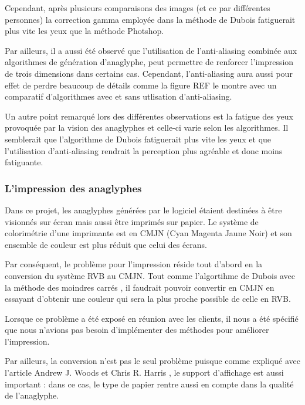 Cependant, après plusieurs comparaisons des images (et ce par différentes personnes) la correction gamma employée dans la méthode de Dubois fatiguerait plus vite les yeux que la méthode Photshop.

Par ailleurs, il a aussi été observé que l'utilisation de l'anti-aliasing combinée aux algorithmes de génération d'anaglyphe, peut permettre de renforcer l'impression de trois dimensions dans certains cas. Cependant, l'anti-aliasing aura aussi pour effet de perdre beaucoup de détails comme la figure REF le montre avec un comparatif d'algorithmes avec et sans utlisation d'anti-aliasing. 

Un autre point remarqué lors des différentes observations est la fatigue des yeux provoquée par la vision des anaglyphes et celle-ci varie selon les algorithmes. Il semblerait que l'algorithme de Dubois fatiguerait plus vite les yeux et que l'utilisation d'anti-aliasing rendrait la perception plus agréable et donc moins fatiguante. 

\subsubsection{L'impression des anaglyphes}
Dans ce projet, les anaglyphes générées par le logiciel étaient destinées à être visionnés sur écran mais aussi être imprimés sur papier. Le système de colorimétrie d'une imprimante est en CMJN (Cyan Magenta Jaune Noir) et son ensemble de couleur est plus réduit que celui des écrans. 


Par conséquent, le problème pour l'impression réside tout d'abord en la conversion du système RVB au CMJN. Tout comme l'algortihme de Dubois avec la méthode des moindres carrés \cite{algoDubois}, il faudrait pouvoir convertir en CMJN en essayant d'obtenir une couleur qui sera la plus proche possible de celle en RVB. 

Lorsque ce problème a été exposé en réunion avec les clients, il nous a été spécifié que nous n'avions pas besoin d'implémenter des méthodes pour améliorer l'impression. 

Par ailleurs, la conversion n'est pas le seul problème puisque comme expliqué avec l'article Andrew J. Woods et Chris R. Harris \cite{anaglypheDefaut}, le support d'affichage est aussi important : dans ce cas, le type de papier rentre aussi en compte dans la qualité de l'anaglyphe. 
